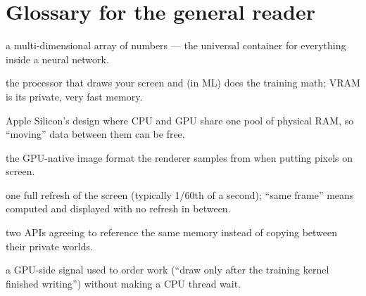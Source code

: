 \documentclass[11pt]{article}
\begin{document}
\section{Glossary for the general reader}

\begin{description}\small
  \item[Tensor] a multi-dimensional array of numbers --- the universal
        container for everything inside a neural network.
  \item[GPU / VRAM] the processor that draws your screen and (in ML) does the
        training math; VRAM is its private, very fast memory.
  \item[Unified memory] Apple Silicon's design where CPU and GPU share one
        pool of physical RAM, so ``moving'' data between them can be free.
  \item[Texture] the GPU-native image format the renderer samples from when
        putting pixels on screen.
  \item[Frame] one full refresh of the screen (typically 1/60th of a
        second); ``same frame'' means computed and displayed with no refresh
        in between.
  \item[Interop] two APIs agreeing to reference the same memory instead of
        copying between their private worlds.
  \item[Semaphore] a GPU-side signal used to order work (``draw only after
        the training kernel finished writing'') without making a CPU thread
        wait.
\end{description}
\end{document}
